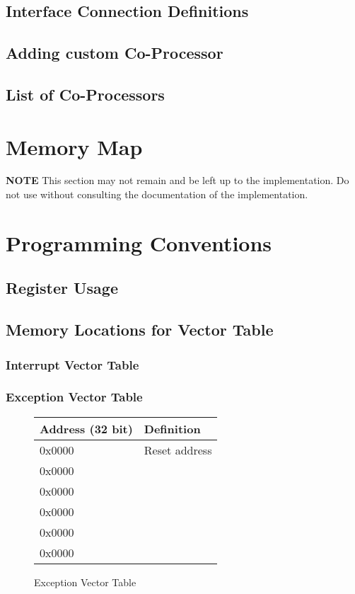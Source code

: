 \documentclass[letterpaper, 11pt]{article}
\begin{document}
\subsection{Interface Connection Definitions}
\subsection{Adding custom Co-Processor}
\subsection{List of Co-Processors}

\section{Memory Map}
\textbf{NOTE}
This section may not remain and be left up to the implementation. Do not use without consulting
the documentation of the implementation.
\section{Programming Conventions}
\subsection{Register Usage}
\subsection{Memory Locations for Vector Table}
\subsubsection{Interrupt Vector Table}
\subsubsection{Exception Vector Table}


\begin{figure}[!h]
	\begin{center}
		\begin{tabular}{|l|l|}
			\hline
			Address (32 bit) &  Definition\\ \hline
			0x0000 & Reset address \\ 	\hline
			0x0000 &  \\ 	\hline
			0x0000 &  \\ 	\hline
			0x0000 &  \\ 	\hline
			0x0000 &  \\ 	\hline
			0x0000 &  \\	\hline
		\end{tabular} 
		\caption{Exception Vector Table}
	\end{center}
	
\end{figure}
\end{document}
